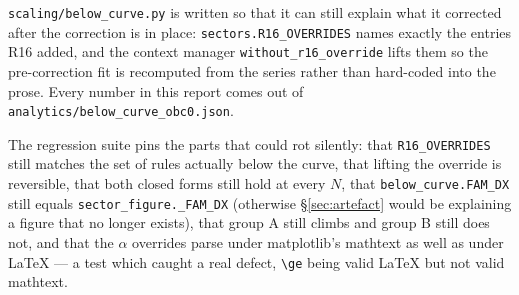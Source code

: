 \documentclass[11pt]{article}
\newcommand{\fn}[1]{\texttt{#1}}
\theoremstyle{plain}
\begin{document}
\noindent \fn{scaling/below\_curve.py} is written so that it can still explain
what it corrected after the correction is in place: \fn{sectors.R16\_OVERRIDES}
names exactly the entries R16 added, and the context manager
\fn{without\_r16\_override} lifts them so the pre-correction fit is recomputed
from the series rather than hard-coded into the prose. Every number in this
report comes out of \fn{analytics/below\_curve\_obc0.json}.

The regression suite pins the parts that could rot silently: that
\fn{R16\_OVERRIDES} still matches the set of rules actually below the curve, that
lifting the override is reversible, that both closed forms still hold at every
$N$, that \fn{below\_curve.FAM\_DX} still equals \fn{sector\_figure.\_FAM\_DX}
(otherwise \S\ref{sec:artefact} would be explaining a figure that no longer
exists), that group A still climbs and group B still does not, and that the
$\alpha$ overrides parse under matplotlib's mathtext as well as under \LaTeX{}
--- a test which caught a real defect, \verb|\ge| being valid \LaTeX{} but not
valid mathtext.
\end{document}
